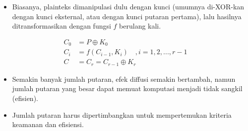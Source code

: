 \documentclass{article}
\begin{document}

\begin{itemize}
  \item Biasanya, plainteks dimanipulasi dulu dengan kunci (umumnya di-XOR-kan dengan kunci eksternal, atau dengan kunci putaran pertama), lalu hasilnya ditransformasikan dengan fungsi $f$ berulang kali.
\end{itemize}

\vspace{10mm}

\begin{align*}
C_0 &= P \oplus K_0 \\
C_i &= f(C_{i-1}, K_i) \quad , i = 1, 2, ..., r-1 \\
C &= C_r = C_{r-1} \oplus K_r
\end{align*}

\vspace{10mm}

\begin{itemize}
  \item Semakin banyak jumlah putaran, efek diffusi semakin bertambah, namun jumlah putaran yang besar dapat memuat komputasi menjadi tidak sangkil (efisien).
  \item Jumlah putaran harus dipertimbangkan untuk mempertemukan kriteria keamanan dan efisiensi.
\end{itemize}
\end{document}
